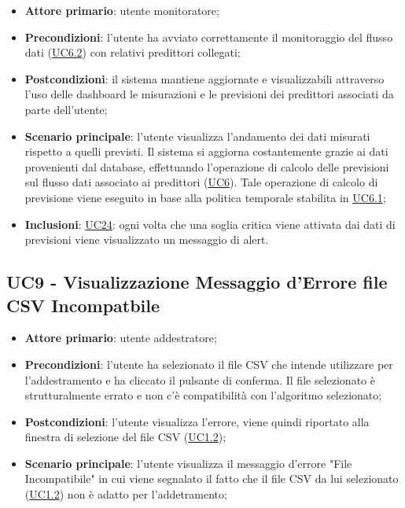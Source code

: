 		\begin{itemize}
			\item\textbf{Attore primario}: utente monitoratore;
			\item\textbf{Precondizioni}: l’utente ha avviato correttamente il monitoraggio del flusso dati (\hyperref[par:UC6.2]{UC6.2}) con relativi predittori collegati;
			\item\textbf{Postcondizioni}: il sistema mantiene aggiornate e visualizzabili attraverso l’uso delle dashboard le misurazioni e le previsioni dei predittori associati da parte dell’utente; 
			\item\textbf{Scenario principale}: l’utente visualizza l’andamento dei dati misurati rispetto a quelli previsti. Il sistema si aggiorna costantemente grazie ai dati provenienti dal database, effettuando l’operazione di calcolo delle previsioni sul flusso dati associato ai predittori (\hyperref[par:UC6]{UC6}). Tale operazione di calcolo di previsione viene eseguito in base alla politica temporale stabilita in \hyperref[par:UC6.1]{UC6.1};		
			\item\textbf{Inclusioni}: \hyperref[par:UC24]{UC24}: ogni volta che una soglia critica viene attivata dai dati di previsioni viene visualizzato un messaggio di alert. 
		\end{itemize}

	
	\label{par:UC9}
	\subsection{UC9 - Visualizzazione Messaggio d'Errore file CSV Incompatbile}
		\begin{itemize}
			\item\textbf{Attore primario}: utente addestratore;
			\item\textbf{Precondizioni}: l’utente ha selezionato il file CSV che intende utilizzare per l'addestramento e ha cliccato il pulsante di conferma. Il file selezionato è strutturalmente errato e non c'è compatibilità con l'algoritmo selezionato;
			\item\textbf{Postcondizioni}: l'utente visualizza l'errore, viene quindi riportato alla finestra di selezione del file CSV (\hyperref[par:UC1.2]{UC1.2});
			\item\textbf{Scenario principale}: l’utente visualizza il messaggio d'errore "File Incompatibile" in cui viene segnalato il fatto che il file CSV da lui selezionato (\hyperref[par:UC1.2]{UC1.2}) non è adatto per l'addetramento;  		
		\end{itemize}

